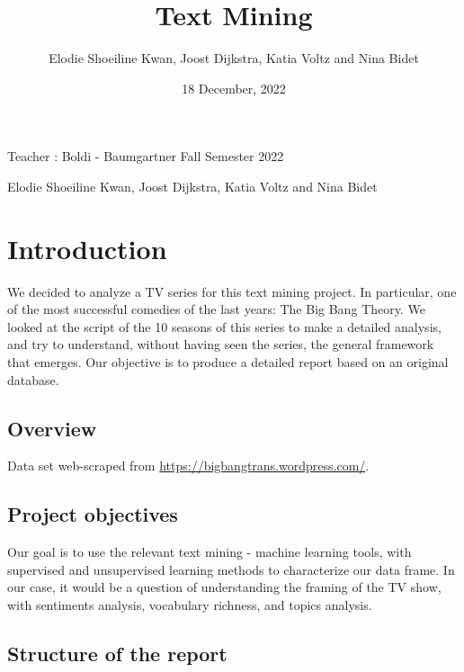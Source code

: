 \documentclass[
]{article}
\title{Text Mining}
\author{Elodie Shoeiline Kwan, Joost Dijkstra, Katia Voltz and Nina
Bidet}
\date{18 December, 2022}
\begin{document}
\maketitle

Teacher : Boldi - Baumgartner Fall Semester 2022

Elodie Shoeiline Kwan, Joost Dijkstra, Katia Voltz and Nina Bidet

\hypertarget{introduction}{%
\section{Introduction}\label{introduction}}

We decided to analyze a TV series for this text mining project. In
particular, one of the most successful comedies of the last years: The
Big Bang Theory. We looked at the script of the 10 seasons of this
series to make a detailed analysis, and try to understand, without
having seen the series, the general framework that emerges. Our
objective is to produce a detailed report based on an original database.

\hypertarget{overview}{%
\subsection{Overview}\label{overview}}

Data set web-scraped from
\href{https://bigbangtrans.wordpress.com/series-1-episode-1-pilot-episode/}{https://bigbangtrans.wordpress.com/}.

\hypertarget{project-objectives}{%
\subsection{Project objectives}\label{project-objectives}}

Our goal is to use the relevant text mining - machine learning tools,
with supervised and unsupervised learning methods to characterize our
data frame. In our case, it would be a question of understanding the
framing of the TV show, with sentiments analysis, vocabulary richness,
and topics analysis.

\hypertarget{structure-of-the-report}{%
\subsection{Structure of the report}\label{structure-of-the-report}}
\end{document}

